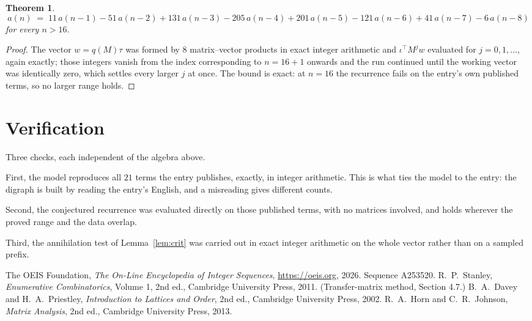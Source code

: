 \documentclass[11pt,a4paper]{article}
\theoremstyle{plain}
\newtheorem{theorem}{Theorem}
\theoremstyle{definition}
\begin{document}
\begin{theorem}
\[
a(n)\;=\;11\,a(n-1) - 51\,a(n-2) + 131\,a(n-3) - 205\,a(n-4) + 201\,a(n-5) - 121\,a(n-6) + 41\,a(n-7) - 6\,a(n-8)
\]
for every $n>16$.
\end{theorem}

\begin{proof}
The vector $w=q(M)\tau$ was formed by $8$ matrix--vector products in exact integer
arithmetic and $\iota^{\!\top}M^{j}w$ evaluated for $j=0,1,\dots$, again exactly; those
integers vanish from the index corresponding to $n=16+1$ onwards and the run continued
until the working vector was identically zero, which settles every larger $j$ at once. The bound is exact: at $n=16$ the recurrence fails on the entry's own published terms, so no larger range holds.
\end{proof}

\section{Verification}

Three checks, each independent of the algebra above.

First, the model reproduces all $21$ terms the entry publishes, exactly, in integer
arithmetic. This is what ties the model to the entry: the digraph is built by reading the
entry's English, and a misreading gives different counts.

Second, the conjectured recurrence was evaluated directly on those published terms, with no
matrices involved, and holds wherever the proved range and the data overlap.

Third, the annihilation test of Lemma~\ref{lem:crit} was carried out in exact integer
arithmetic on the whole vector rather than on a sampled prefix.

\begin{thebibliography}{9}
 The OEIS Foundation, \emph{The On-Line Encyclopedia of Integer
Sequences}, \url{https://oeis.org}, 2026. Sequence A253520.
 R.~P.~Stanley, \emph{Enumerative Combinatorics}, Volume 1, 2nd ed.,
Cambridge University Press, 2011. (Transfer-matrix method, Section 4.7.)
 B.~A.~Davey and H.~A.~Priestley, \emph{Introduction to Lattices and
Order}, 2nd ed., Cambridge University Press, 2002.
 R.~A.~Horn and C.~R.~Johnson, \emph{Matrix Analysis}, 2nd ed., Cambridge
University Press, 2013.
\end{thebibliography}
\end{document}
